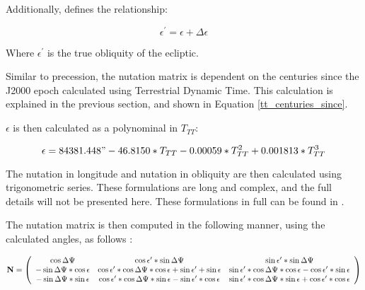 Additionally, \cite{Bond1} defines the relationship:

\begin{equation}\label{true_obliquity}
\epsilon^{\prime} = \epsilon + \Delta\epsilon
\end{equation}

Where $\epsilon^{\prime}$ is the true obliquity of the ecliptic.

Similar to precession, the nutation matrix is dependent on the centuries
since the J2000 epoch calculated using Terrestrial Dynamic Time. This
calculation is explained in the previous section, and shown in Equation
\ref{tt_centuries_since}.

$\epsilon$ is then calculated as a polynominal in $T_{TT}$:

\begin{equation} \label{mean_obliquity_formula}
\epsilon = 84381.448"  - 46.8150 * T_{TT} - 0.00059 * T^2_{TT} + 0.001813 * T^3_{TT}
\end{equation}

The nutation in longitude and nutation in obliquity are then calculated using
trigonometric series. These formulations are long and complex, and the full
details will not be presented here. These formulations in full can be found
in \cite{Bond1}.

The nutation matrix is then computed in the following manner, using the
calculated angles, as follows \cite{Bond1}:

\begin{equation}\label{nutation_matrix}
{\bf N} =
\left( \begin{array} {ccc}

\cos \Delta\Psi
& \cos \epsilon^{\prime} * \sin \Delta\Psi
& \sin \epsilon^{\prime} * \sin \Delta\Psi \\

-\sin \Delta\Psi * \cos \epsilon
& \cos \epsilon^{\prime} * \cos \Delta\Psi * \cos \epsilon + \sin \epsilon^{\prime} + \sin \epsilon
& \sin \epsilon^{\prime} * \cos \Delta\Psi * \cos \epsilon - \cos \epsilon^{\prime}* \sin \epsilon \\

-\sin \Delta\Psi * \sin \epsilon
& \cos \epsilon^{\prime} * \cos \Delta\Psi * \sin \epsilon - \sin \epsilon^{\prime} * \cos \epsilon
& \sin \epsilon^{\prime} * \cos \Delta\Psi * \sin \epsilon + \cos \epsilon^{\prime} * \cos \epsilon

\end{array} \right)
\end{equation}

